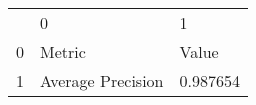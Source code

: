 \begin{tabular}{lll}
 & 0 & 1 \\
0 & Metric & Value \\
1 & Average Precision & 0.987654 \\
\end{tabular}
